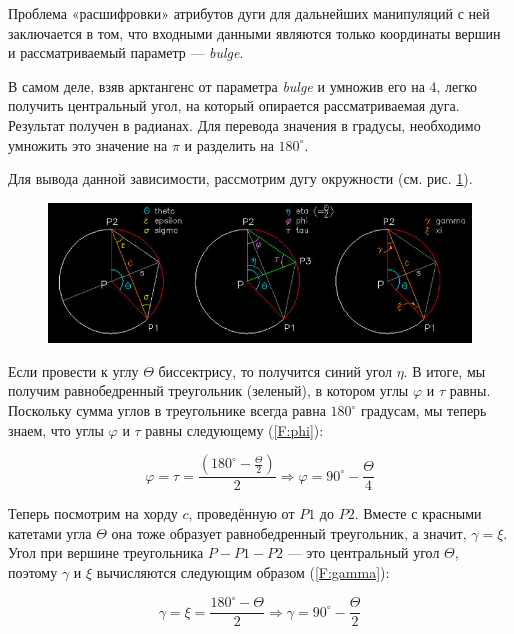 Проблема «расшифровки» атрибутов дуги для дальнейших манипуляций с ней заключается в том, что входными данными являются только координаты вершин и рассматриваемый параметр --- \textit{bulge}.

В самом деле, взяв арктангенс от параметра \textit{bulge} и умножив его на $4$, легко получить центральный угол, на который опирается рассматриваемая дуга. Результат получен в радианах. Для перевода значения в градусы, необходимо умножить это значение на $\pi$ и разделить на $180^{\circ}$.

Для вывода данной зависимости, рассмотрим дугу окружности (см. рис. \ref{fig:arcchord}).

\begin{figure}[H]
	\centering
	\includegraphics[width=1.0\textwidth]{figures/arcchord.png}
	\label{fig:arcchord}
\end{figure}

Если провести к углу $\Theta$ биссектрису, то получится синий угол $\eta$. В итоге, мы получим равнобедренный треугольник (зеленый), в котором углы $\varphi$ и $\tau$ равны. Поскольку сумма углов в треугольнике всегда равна $180^{\circ}$ градусам, мы теперь знаем, что углы $\varphi$ и $\tau$ равны следующему (\ref{F:phi}):

\begin{equation}
	\varphi=\tau=\frac{(180^{\circ}-\frac{\Theta}{2})}{2}\Rightarrow\varphi=90^{\circ}-\frac{\Theta}{4}
	\label{F:phi}
\end{equation}

Теперь посмотрим на хорду $c$, проведённую от $P1$ до $P2$. Вместе с красными катетами угла $\Theta$ она тоже образует равнобедренный треугольник, а значит, $\gamma=\xi$. Угол при вершине треугольника $P-P1-P2$ --- это центральный угол $\Theta$, поэтому $\gamma$ и $\xi$ вычисляются следующим образом (\ref{F:gamma}):

\begin{equation}
	\gamma=\xi=\frac{180^{\circ}-\Theta}{2}\Rightarrow\gamma=90^{\circ}-\frac{\Theta}{2}
	\label{F:gamma}
\end{equation}

